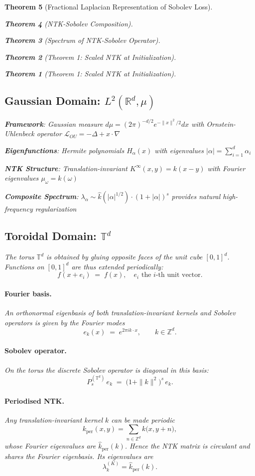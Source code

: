 \documentclass{article}
\newtheorem{theorem}{Theorem}[section]
\begin{document}
\begin{theorem}[Fractional Laplacian Representation of Sobolev Loss]
\begin{theorem}[NTK-Sobolev Composition]
\begin{theorem}[Spectrum of NTK-Sobolev Operator]
\begin{theorem}[Theorem 1: Scaled NTK at Initialization]
\begin{theorem}[Theorem 1: Scaled NTK at Initialization]
\subsection{Gaussian Domain: $L^2(\mathbb{R}^d, \mu)$}

\textbf{Framework}: Gaussian measure $d\mu = (2\pi)^{-d/2} e^{-\|x\|^2/2} dx$ with Ornstein-Uhlenbeck operator $\mathcal{L}_{OU} = -\Delta + x \cdot \nabla$

\textbf{Eigenfunctions}: Hermite polynomials $H_{\alpha}(x)$ with eigenvalues $|\alpha| = \sum_{i=1}^d \alpha_i$

\textbf{NTK Structure}: Translation-invariant $K^{\infty}(x, y) = k(x - y)$ with Fourier eigenvalues $\mu_\omega = \hat{k}(\omega)$

\textbf{Composite Spectrum}: $\lambda_\alpha \sim \hat{k}(|\alpha|^{1/2}) \cdot (1 + |\alpha|)^s$ provides natural high-frequency regularization

\subsection{Toroidal Domain: $\mathbb{T}^d$}

The torus $\mathbb{T}^d$ is obtained by gluing opposite faces of the unit cube $[0,1]^d$.  Functions on $[0,1]^d$ are thus extended periodically:
\[
  f(x+e_i) \;=\; f(x), \quad e_i \text{ the } i\text{-th unit vector.}
\]

\paragraph{Fourier basis.}  An orthonormal eigenbasis of both translation-invariant kernels and Sobolev operators is given by the Fourier modes
\[
   e_k(x) \;=\; e^{2\pi i k\cdot x}, \qquad k\in\mathbb Z^d.
\]

\paragraph{Sobolev operator.}  On the torus the discrete Sobolev operator is diagonal in this basis:
\[
   P_s^{(\mathbb{T}^d)}\,e_k\;=\;\bigl(1+\|k\|^2\bigr)^{s}\,e_k.
\]

\paragraph{Periodised NTK.}  Any translation-invariant kernel $k$ can be made periodic
\[
   k_{\text{per}}(x,y)=\sum_{n\in\mathbb Z^d} k\bigl(x, y+n\bigr),
\]
whose Fourier eigenvalues are $\widehat{k}_{\text{per}}(k)$.  Hence the NTK matrix is circulant and shares the Fourier eigenbasis.  Its eigenvalues are
\[
   \lambda_k^{(K)}=\widehat{k}_{\text{per}}(k).
\]


\end{theorem}
\end{theorem}
\end{theorem}
\end{theorem}
\end{theorem}
\end{document}
